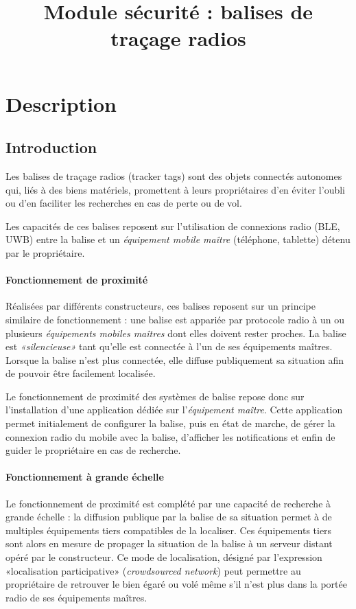 \documentclass[headings=small,cmyk,french,a4paper,twocolumn,garamond,11pt]{scrartcl}
\title{Module sécurité : balises de traçage radios}\date{}
\begin{document}
\maketitle{}
\section{Description}
\subsection{Introduction}
Les balises de traçage radios (tracker tags)  sont des objets connectés
autonomes qui, liés à des biens matériels, promettent à leurs
propriétaires d'en éviter l'oubli ou d'en faciliter les recherches en
cas de perte ou de vol.

Les capacités de ces balises reposent sur l'utilisation de connexions
radio (\acrshort{BLE},  \acrshort{UWB}) entre la balise et un
\emph{équipement mobile maître} (téléphone, tablette) détenu par le  propriétaire.

\paragraph{Fonctionnement de proximité}
Réalisées par différents constructeurs, ces balises reposent sur un
principe similaire de fonctionnement : une balise est appariée par
protocole radio à un ou plusieurs \emph{équipements mobiles maîtres} dont
elles doivent rester proches. La balise est \textsl{«silencieuse»}
tant qu'elle est connectée à l'un de ses équipements maîtres.  Lorsque
la balise n'est plus connectée, elle diffuse publiquement sa situation
afin de pouvoir être facilement localisée.

Le fonctionnement de proximité des systèmes de balise repose donc sur
l'installation d'une application dédiée sur l'\emph{équipement maître}. Cette
application permet initialement de configurer la balise, puis en état
de marche, de gérer la connexion radio du mobile avec la balise,
d'afficher les notifications et enfin de guider le propriétaire en cas
de recherche.
\paragraph{Fonctionnement à grande échelle}
Le fonctionnement de proximité est complété par une capacité de
recherche à grande échelle : la diffusion publique par la balise de sa
situation permet à de multiples équipements tiers compatibles de la
localiser. Ces équipements tiers sont alors en mesure de propager la
situation de la balise à un serveur distant opéré par le
constructeur. Ce mode de localisation, désigné par l'expression
«localisation participative» (\emph{crowdsourced network}) peut
permettre au propriétaire de retrouver le bien égaré ou volé même s'il
n'est plus dans la portée radio de ses équipements maîtres.
\end{document}
